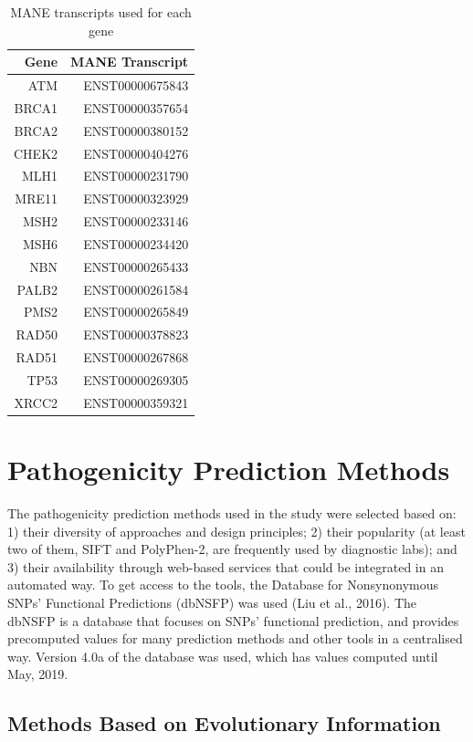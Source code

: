 \documentclass[12pt,MSc,wordcount,anon]{muthesis}
\begin{document}
\begin{flushleft}
\begin{table}
\begin{center}
\begin{tabular}{|r|r|}\hline\hline
Gene&MANE Transcript\\\hline
ATM&ENST00000675843\\
BRCA1&ENST00000357654\\
BRCA2&ENST00000380152\\
CHEK2&ENST00000404276\\
MLH1&ENST00000231790\\
MRE11&ENST00000323929\\
MSH2&ENST00000233146\\
MSH6&ENST00000234420\\
NBN&ENST00000265433\\
PALB2&ENST00000261584\\
PMS2&ENST00000265849\\
RAD50&ENST00000378823\\
RAD51&ENST00000267868\\
TP53&ENST00000269305\\
XRCC2&ENST00000359321\\\hline\hline
\end{tabular}
\end{center}
\caption{MANE transcripts used for each gene}\label{wombat}
\end{table}

\section{Pathogenicity Prediction Methods}

The pathogenicity prediction methods used in the study were selected based on: 1) their diversity of approaches and design principles; 2) their popularity (at least two of them, SIFT and PolyPhen-2, are frequently used by diagnostic labs); and 3) their availability through web-based services that could be integrated in an automated way. To get access to the tools, the Database for Nonsynonymous SNPs' Functional Predictions (dbNSFP) was used (Liu et al., 2016). The dbNSFP is a database that focuses on SNPs' functional prediction, and provides precomputed values for many prediction methods and other tools in a centralised way. Version 4.0a of the database was used, which has values computed until May, 2019.

\subsection{Methods Based on Evolutionary Information}


\end{flushleft}
\end{document}
